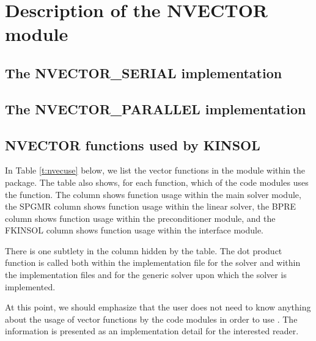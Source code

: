 \chapter{Description of the NVECTOR module}\label{s:nvector}


\section{The NVECTOR\_SERIAL implementation}\label{ss:nvec_ser}


\section{The NVECTOR\_PARALLEL implementation}\label{ss:nvec_par}


\section{NVECTOR functions used by KINSOL}

In Table \ref{t:nvecuse} below, we list the vector functions in the 
{\nvector} module within the {\kinsol} package.
The table also shows, for each function, which of the code modules uses
the function. The {\kinsol} column shows function usage within the main
solver module, the SPGMR column shows function usage
within the {\kinspgmr} linear solver, the BPRE column shows function
usage within the {\kinbbdpre} preconditioner module, and the FKINSOL
column shows function usage within the {\fkinsol} interface module.

There is one subtlety in the {\kinspgmr} column hidden by the table. 
The dot product function  is called both within the 
implementation file  for the {\kinspgmr} solver and within 
the implementation files  and  for the generic {\spgmr} 
solver upon which the {\kinspgmr} solver is implemented.

At this point, we should emphasize that the {\kinsol} user does not need to know 
anything about the usage of vector functions by the {\kinsol} code modules in order 
to use {\kinsol}. The information is presented as an implementation detail for the 
interested reader.


